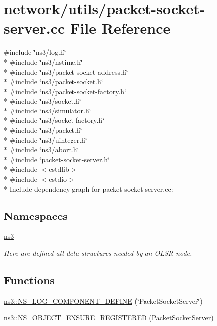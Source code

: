 \hypertarget{packet-socket-server_8cc}{}\section{network/utils/packet-\/socket-\/server.cc File Reference}
\label{packet-socket-server_8cc}
{\ttfamily \#include \char`\"{}ns3/log.\+h\char`\"{}}\\*
{\ttfamily \#include \char`\"{}ns3/nstime.\+h\char`\"{}}\\*
{\ttfamily \#include \char`\"{}ns3/packet-\/socket-\/address.\+h\char`\"{}}\\*
{\ttfamily \#include \char`\"{}ns3/packet-\/socket.\+h\char`\"{}}\\*
{\ttfamily \#include \char`\"{}ns3/packet-\/socket-\/factory.\+h\char`\"{}}\\*
{\ttfamily \#include \char`\"{}ns3/socket.\+h\char`\"{}}\\*
{\ttfamily \#include \char`\"{}ns3/simulator.\+h\char`\"{}}\\*
{\ttfamily \#include \char`\"{}ns3/socket-\/factory.\+h\char`\"{}}\\*
{\ttfamily \#include \char`\"{}ns3/packet.\+h\char`\"{}}\\*
{\ttfamily \#include \char`\"{}ns3/uinteger.\+h\char`\"{}}\\*
{\ttfamily \#include \char`\"{}ns3/abort.\+h\char`\"{}}\\*
{\ttfamily \#include \char`\"{}packet-\/socket-\/server.\+h\char`\"{}}\\*
{\ttfamily \#include $<$cstdlib$>$}\\*
{\ttfamily \#include $<$cstdio$>$}\\*
Include dependency graph for packet-\/socket-\/server.cc\+:
\subsection*{Namespaces}
\begin{DoxyCompactItemize}
\item 
 \hyperlink{namespacens3}{ns3}
\begin{DoxyCompactList}\small\item\em Here are defined all data structures needed by an O\+L\+SR node. \end{DoxyCompactList}\end{DoxyCompactItemize}
\subsection*{Functions}
\begin{DoxyCompactItemize}
\item 
\hyperlink{namespacens3_ade1f6e63fc9ff3077f6b212346ea56bc}{ns3\+::\+N\+S\+\_\+\+L\+O\+G\+\_\+\+C\+O\+M\+P\+O\+N\+E\+N\+T\+\_\+\+D\+E\+F\+I\+NE} (\char`\"{}Packet\+Socket\+Server\char`\"{})
\item 
\hyperlink{namespacens3_a13d62025b568fa10b2be95a30650d84e}{ns3\+::\+N\+S\+\_\+\+O\+B\+J\+E\+C\+T\+\_\+\+E\+N\+S\+U\+R\+E\+\_\+\+R\+E\+G\+I\+S\+T\+E\+R\+ED} (Packet\+Socket\+Server)
\end{DoxyCompactItemize}
